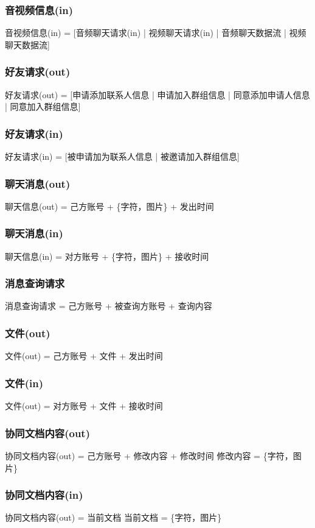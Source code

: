             \subsubsection{音视频信息(in)}
                音视频信息(in) = [音频聊天请求(in) | 视频聊天请求(in) | 音频聊天数据流 | 视频聊天数据流]
            \subsubsection{好友请求(out)}
                好友请求(out) = [申请添加联系人信息 | 申请加入群组信息 | 同意添加申请人信息 | 同意加入群组信息]
            \subsubsection{好友请求(in)}
                好友请求(in) = [被申请加为联系人信息 | 被邀请加入群组信息]
            \subsubsection{聊天消息(out)}
                聊天信息(out) = 己方账号 + \{字符，图片\} + 发出时间
            \subsubsection{聊天消息(in)}
                聊天信息(in) = 对方账号 + \{字符，图片\} + 接收时间
            \subsubsection{消息查询请求}
                消息查询请求 = 己方账号 + 被查询方账号 + 查询内容
            \subsubsection{文件(out)}
                文件(out) = 己方账号 + 文件 + 发出时间
            \subsubsection{文件(in)}
                文件(out) = 对方账号 + 文件 + 接收时间
            \subsubsection{协同文档内容(out)}
                协同文档内容(out) = 己方账号 + 修改内容 + 修改时间
                修改内容 = \{字符，图片\}
            \subsubsection{协同文档内容(in)}
                协同文档内容(out) = 当前文档
                当前文档 = \{字符，图片\}
